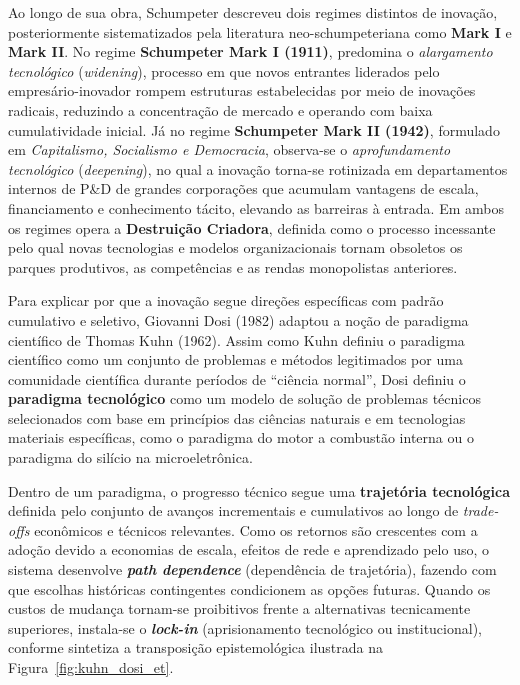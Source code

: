 Ao longo de sua obra, Schumpeter descreveu dois regimes distintos de inovação, posteriormente sistematizados pela literatura neo-schumpeteriana como \textbf{Mark I} e \textbf{Mark II}. No regime \textbf{Schumpeter Mark I (1911)}, predomina o \textit{alargamento tecnológico} (\textit{widening}), processo em que novos entrantes liderados pelo empresário-inovador rompem estruturas estabelecidas por meio de inovações radicais, reduzindo a concentração de mercado e operando com baixa cumulatividade inicial. Já no regime \textbf{Schumpeter Mark II (1942)}, formulado em \textit{Capitalismo, Socialismo e Democracia}, observa-se o \textit{aprofundamento tecnológico} (\textit{deepening}), no qual a inovação torna-se rotinizada em departamentos internos de P\&D de grandes corporações que acumulam vantagens de escala, financiamento e conhecimento tácito, elevando as barreiras à entrada. Em ambos os regimes opera a \textbf{Destruição Criadora}, definida como o processo incessante pelo qual novas tecnologias e modelos organizacionais tornam obsoletos os parques produtivos, as competências e as rendas monopolistas anteriores.

Para explicar por que a inovação segue direções específicas com padrão cumulativo e seletivo, Giovanni Dosi (1982) adaptou a noção de paradigma científico de Thomas Kuhn (1962). Assim como Kuhn definiu o paradigma científico como um conjunto de problemas e métodos legitimados por uma comunidade científica durante períodos de ``ciência normal'', Dosi definiu o \textbf{paradigma tecnológico} como um modelo de solução de problemas técnicos selecionados com base em princípios das ciências naturais e em tecnologias materiais específicas, como o paradigma do motor a combustão interna ou o paradigma do silício na microeletrônica.

Dentro de um paradigma, o progresso técnico segue uma \textbf{trajetória tecnológica} definida pelo conjunto de avanços incrementais e cumulativos ao longo de \textit{trade-offs} econômicos e técnicos relevantes. Como os retornos são crescentes com a adoção devido a economias de escala, efeitos de rede e aprendizado pelo uso, o sistema desenvolve \textbf{\textit{path dependence}} (dependência de trajetória), fazendo com que escolhas históricas contingentes condicionem as opções futuras. Quando os custos de mudança tornam-se proibitivos frente a alternativas tecnicamente superiores, instala-se o \textbf{\textit{lock-in}} (aprisionamento tecnológico ou institucional), conforme sintetiza a transposição epistemológica ilustrada na Figura~\ref{fig:kuhn_dosi_et}.

